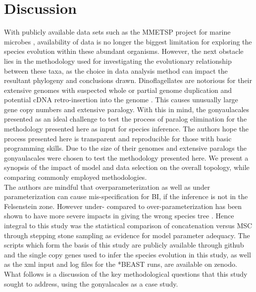 \documentclass[12pt]{article}
\begin{document}
\newpage
\section{Discussion}
With publicly available data sets such as the MMETSP project for marine microbes \cite{keeling2014marine}, availability of data is no longer the biggest limitation for exploring the species evolution within these abundant organisms. 
However, the next obstacle lies in the methodology used for investigating the evolutionary relationship between these taxa, as the choice in data analysis method can impact the resultant phylogeny and conclusions drawn. 
Dinoflagellates are notorious for their extensive genomes with suspected whole or partial genome duplication and potential cDNA retro-insertion into the genome \cite{van2009florida.beauchemin2012dinoflagellate,slamovits2008widespread,hou2009distinct,lin2011genomic}. 
This causes unusually large gene copy numbers and extensive paralogy. 
With this in mind, the gonyaulacales presented as an ideal challenge to test the process of paralog elimination for the methodology presented here as input for species inference.  
The authors hope the process presented here is transparent and reproducible for those with basic programming skills. 
Due to the size of their genomes and extensive paralogs the gonyaulacales were chosen to test the methodology presented here.
We present a synopsis of the impact of model and data selection on the overall topology, while comparing commonly employed methodologies. \\
The authors are mindful that overparameterization as well as under parameterization can cause mis-specification for BI, if the inference is not in the Felsenstein zone. 
However under- compared to over-parameterization has been shown to have  more severe impacts in giving the wrong species tree \cite{lemmon2004importance}. 
Hence integral to this study was the statistical comparison of concatenation versus MSC through stepping stone sampling as evidence for model parameter adequacy. 
The scripts which form the basis of this study are publicly available through github and the single copy genes used to infer the species evolution in this study, as well as the xml input and log files for the *BEAST runs, are available on zenodo. 
What follows is a discussion of the key methodological questions that this study sought to address, using the gonyalacales as a case study. 
\end{document}
